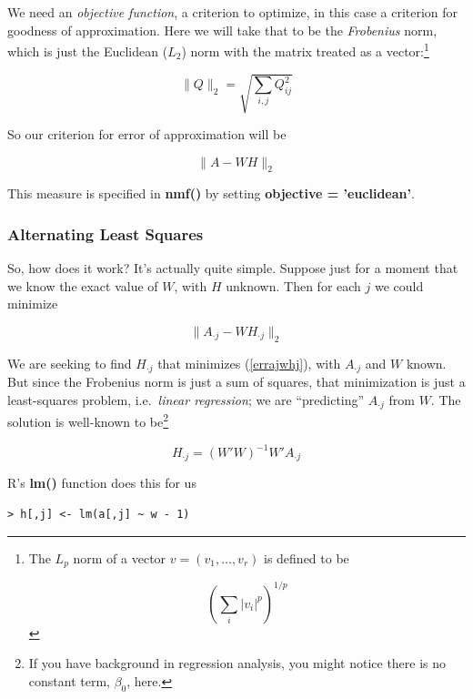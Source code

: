 We need an {\it objective function}, a criterion to optimize, in this
case a criterion for goodness of approximation. Here we will take that
to be the {\it Frobenius} norm, which is just the Euclidean ($L_2$)
norm with the matrix treated as a vector:\footnote{The $L_p$ norm of a
vector $v = (v_1,...,v_r)$ is defined to be

$$
\left (\sum_i |v_i|^p \right )^{1/p}
$$
}

\begin{equation}
\|Q\|_2 = 
\sqrt{
\sum_{i,j} Q_{ij}^2
}
\end{equation}

So our criterion for error of approximation will be

\begin{equation}
\label{errawh}
\|A - WH\|_2
\end{equation}

This measure is specified in {\bf nmf()} by setting {\bf objective =
'euclidean'}.

\subsubsection{Alternating Least Squares}

So, how does it work?  It's actually quite simple.  Suppose just for a
moment that we know the exact value of $W$, with $H$ unknown.  Then for
each $j$ we could minimize

\begin{equation}
\label{errajwhj}
\|A_{\cdot j} - W H_{\cdot j}\|_2
\end{equation}

We are seeking to find $H_{\cdot j}$ that minimizes (\ref{errajwhj}),
with $A_{\cdot j}$ and $W$ known.  But since the Frobenius norm is just
a sum of squares, that minimization is just a least-squares problem,
i.e.\ {\it linear regression}; we are ``predicting'' $A_{\cdot j}$ from
$W$.  The solution is well-known to be\footnote{If you have background
in regression analysis, you might notice there is no constant term,
$\beta_0$, here.}

\begin{equation}
H_{\cdot j} = (W'W)^{-1} W' A_{\cdot j}
\end{equation}

R's {\bf lm()} function does this for us

\begin{lstlisting}
> h[,j] <- lm(a[,j] ~ w - 1)
\end{lstlisting}

